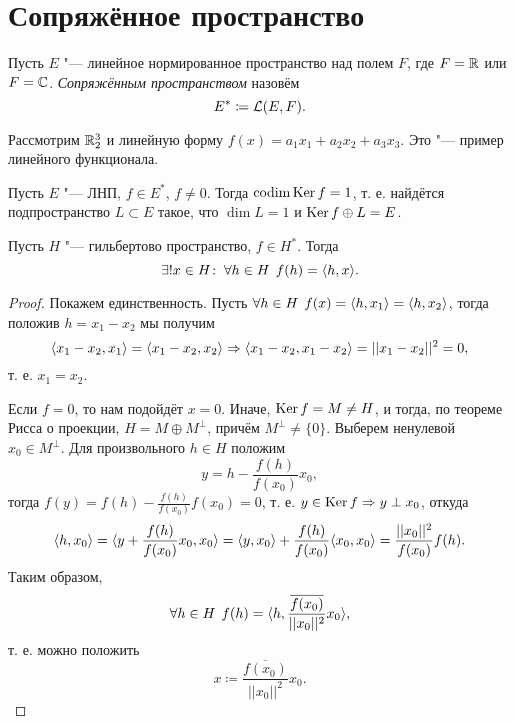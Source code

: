 \documentclass[main]{subfiles}
\begin{document}
\section{Сопряжённое пространство} %

\begin{definition}
  Пусть \( E \) "--- линейное нормированное пространство
  над полем \( F \),
  где \( F = \mathbb{R} \) или \( F = \mathbb{C} \).
  \emph{Сопряжённым пространством} назовём
  \[ E^* \coloneqq \Linears{E}[F]. \]
\end{definition}

\begin{example}
  Рассмотрим \( \mathbb{R}_2^3 \) и линейную форму
  \( f(x) = a_1 x_1 + a_2 x_2 + a_3 x_3 \).
  Это "--- пример линейного функционала.
\end{example}

\begin{exercise}
  Пусть \( E \) "--- ЛНП, \( f \in E^* \), \( f \ne 0 \).
  Тогда \( \operatorname{codim} \operatorname{Ker} f = 1 \),
  т. е. найдётся подпространство \( L \subset E \)
  такое, что \( \dim L = 1 \) и \( \operatorname{Ker} f \oplus L = E \).
\end{exercise}

\begin{theorem}
  Пусть \( H \) "--- гильбертово пространство,
  \( f \in H^* \). Тогда
  \[ \exists! x \in H \colon \: \forall {h \in H} \; \, f(h) = \langle h, x \rangle. \]
\end{theorem}
\begin{proof}
  Покажем единственность.
  Пусть
  \( \forall {h \in H} \; \, f(x) = \langle h, x_1 \rangle = \langle h, x_2 \rangle \),
  тогда положив \( h = x_1 - x_2 \)
  мы получим
  \[
    \langle x_1 - x_2, x_1 \rangle =
    \langle x_1 - x_2, x_2 \rangle \Rightarrow
    \langle x_1 - x_2, x_1 - x_2 \rangle = ||x_1 - x_2||^2 = 0,
  \]
  т. е. \( x_1 = x_2 \).

  Если \( f = 0 \), то нам подойдёт \( x = 0 \).
  Иначе, \( \operatorname{Ker} f = M \ne H \),
  и тогда, по теореме Рисса о проекции,
  \( H = M \oplus M^\perp \),
  причём \( M^\perp \ne \{ 0 \} \).
  Выберем ненулевой \( x_0 \in M^\perp \). Для произвольного
  \( h \in H \) положим
  \[
    y = h - \frac{f(h)}{f(x_0)} x_0,
  \]
  тогда \( f(y) = f(h) - \frac{f(h)}{f(x_0)} f(x_0) = 0 \),
  т. е. \( y \in \operatorname{Ker} f \Rightarrow y \perp x_0 \),
  откуда
  \[
    \langle h, x_0 \rangle = \langle y + \frac{f(h)}{f(x_0)} x_0, x_0 \rangle =
    \langle y, x_0 \rangle + \frac{f(h)}{f(x_0)} \langle x_0, x_0 \rangle =
    \frac{||x_0||^2}{f(x_0)} f(h).
  \]
  Таким образом,
  \[
    \forall {h \in H} \; \, f(h) = \langle h, \frac{\overline{f(x_0)}}{||x_0||^2} x_0 \rangle,
  \]
  т. е. можно положить
  \[ x \coloneqq \frac{\overline{f(x_0)}}{||x_0||^2} x_0. \]
\end{proof}
\end{document}
